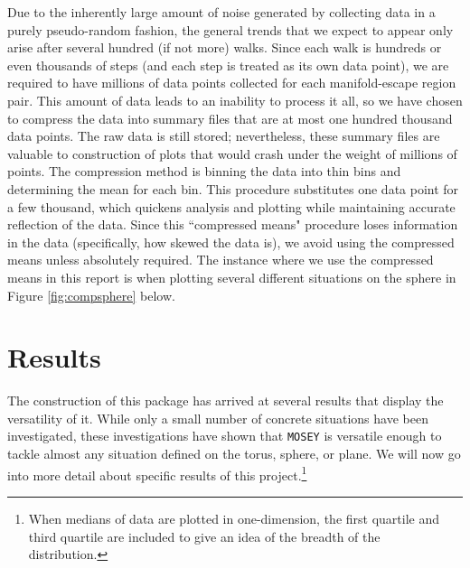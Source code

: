 \documentclass[12pt]{article}
\newcommand{\MOSEY}{\texttt{MOSEY}}
\begin{document}
		Due to the inherently large amount of noise generated by collecting data in a purely pseudo-random fashion, the general trends that we expect to appear only arise after several hundred (if not more) walks.
		Since each walk is hundreds or even thousands of steps (and each step is treated as its own data point), we are required to have millions of data points collected for each manifold-escape region pair.
		This amount of data leads to an inability to process it all, so we have chosen to compress the data into summary files that are at most one hundred thousand data points.
		The raw data is still stored; nevertheless, these summary files are valuable to construction of plots that would crash under the weight of millions of points.
		The compression method is binning the data into thin bins and determining the mean for each bin.
		This procedure substitutes one data point for a few thousand, which quickens analysis and plotting while maintaining accurate reflection of the data.
		Since this ``compressed means" procedure loses information in the data (specifically, how skewed the data is), we avoid using the compressed means unless absolutely required.
		The instance where we use the compressed means in this report is when plotting several different situations on the sphere in Figure \ref{fig:compsphere} below.

\section{Results}
	The construction of this package has arrived at several results that display the versatility of it.
	While only a small number of concrete situations have been investigated, these investigations have shown that \MOSEY{} is versatile enough to tackle almost any situation defined on the torus, sphere, or plane.
	We will now go into more detail about specific results of this project.\footnote{
		When medians of data are plotted in one-dimension, the first quartile and third quartile are included to give an idea of the breadth of the distribution.
		}
	
\end{document}
